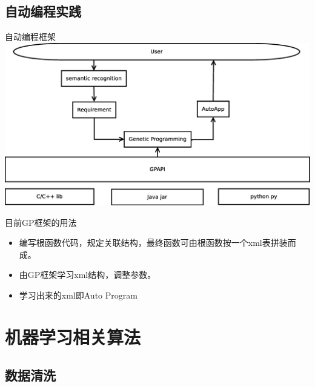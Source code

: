\documentclass{beamer}
\begin{document}
\subsection{自动编程实践}
\begin{frame}{自动编程框架}
\includegraphics[height=0.8\textheight]{../pics/Frame.eps}
\end{frame}
\begin{frame}{目前GP框架的用法}
\begin{itemize}
\item 编写根函数代码，规定关联结构，最终函数可由根函数按一个xml表拼装而成。
\item 由GP框架学习xml结构，调整参数。
\item 学习出来的xml即Auto Program
\end{itemize}
\end{frame}
\section{机器学习相关算法}
\subsection{数据清洗}
\end{document}

